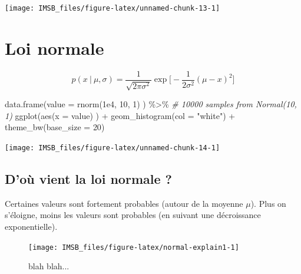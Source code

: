 \documentclass[
  a4paper,11pt,twoside,onecolumn,openright,final,oldfontcommands]{memoir}
\newenvironment{Shaded}{\begin{snugshade}}{\end{snugshade}}
\newcommand{\AttributeTok}[1]{\textcolor[rgb]{0.77,0.63,0.00}{#1}}
\newcommand{\CommentTok}[1]{\textcolor[rgb]{0.56,0.35,0.01}{\textit{#1}}}
\newcommand{\DecValTok}[1]{\textcolor[rgb]{0.00,0.00,0.81}{#1}}
\newcommand{\FloatTok}[1]{\textcolor[rgb]{0.00,0.00,0.81}{#1}}
\newcommand{\FunctionTok}[1]{\textcolor[rgb]{0.00,0.00,0.00}{#1}}
\newcommand{\NormalTok}[1]{#1}
\newcommand{\SpecialCharTok}[1]{\textcolor[rgb]{0.00,0.00,0.00}{#1}}
\newcommand{\StringTok}[1]{\textcolor[rgb]{0.31,0.60,0.02}{#1}}
\theoremstyle{definition}
\theoremstyle{definition}
\theoremstyle{definition}
\theoremstyle{definition}
\theoremstyle{remark}
\begin{document}
\begin{center}\texttt{[image: IMSB\_files/figure-latex/unnamed-chunk-13-1]} \end{center}

\hypertarget{loi-normale}{%
\section{Loi normale}\label{loi-normale}}

\[
p(x \ | \ \mu, \sigma) = \frac{1}{\sqrt{2 \pi \sigma^{2}}} \exp \bigg[-\frac{1}{2 \sigma^{2}} (\mu - x)^{2} \bigg]
\]

\begin{Shaded}
\begin{Highlighting}[]
\FunctionTok{data.frame}\NormalTok{(}\AttributeTok{value =} \FunctionTok{rnorm}\NormalTok{(}\FloatTok{1e4}\NormalTok{, }\DecValTok{10}\NormalTok{, }\DecValTok{1}\NormalTok{) ) }\SpecialCharTok{\%\textgreater{}\%} \CommentTok{\# 10000 samples from Normal(10, 1)}
    \FunctionTok{ggplot}\NormalTok{(}\FunctionTok{aes}\NormalTok{(}\AttributeTok{x =}\NormalTok{ value) ) }\SpecialCharTok{+}
    \FunctionTok{geom\_histogram}\NormalTok{(}\AttributeTok{col =} \StringTok{"white"}\NormalTok{) }\SpecialCharTok{+}
    \FunctionTok{theme\_bw}\NormalTok{(}\AttributeTok{base\_size =} \DecValTok{20}\NormalTok{)}
\end{Highlighting}
\end{Shaded}

\begin{center}\texttt{[image: IMSB\_files/figure-latex/unnamed-chunk-14-1]} \end{center}

\hypertarget{douxf9-vient-la-loi-normale}{%
\subsection{D'où vient la loi normale ?}\label{douxf9-vient-la-loi-normale}}

Certaines valeurs sont fortement probables (autour de la moyenne \(\mu\)). Plus on s'éloigne, moins les valeurs sont probables (en suivant une décroissance exponentielle).

\begin{figure}[!htb]

{\centering \texttt{[image: IMSB\_files/figure-latex/normal-explain1-1]} 

}

\caption{blah blah...}\label{fig:normal-explain1}
\end{figure}
\end{document}
